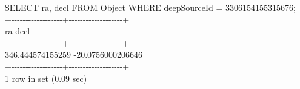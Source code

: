 \documentclass[DM,toc]{lsstdoc}
\begin{document}
SELECT ra, decl FROM Object WHERE deepSourceId = 3306154155315676;\\
+-\/-\/-\/-\/-\/-\/-\/-\/-\/-\/-\/-\/-\/-\/-\/-\/-\/-+-\/-\/-\/-\/-\/-\/-\/-\/-\/-\/-\/-\/-\/-\/-\/-\/-\/-\/-+\\
\textbar{} ra \textbar{} decl \textbar{}\\
+-\/-\/-\/-\/-\/-\/-\/-\/-\/-\/-\/-\/-\/-\/-\/-\/-\/-+-\/-\/-\/-\/-\/-\/-\/-\/-\/-\/-\/-\/-\/-\/-\/-\/-\/-\/-+\\
\textbar{} 346.444574155259 \textbar{} -20.0756000206646 \textbar{}\\
+-\/-\/-\/-\/-\/-\/-\/-\/-\/-\/-\/-\/-\/-\/-\/-\/-\/-+-\/-\/-\/-\/-\/-\/-\/-\/-\/-\/-\/-\/-\/-\/-\/-\/-\/-\/-+\\
1 row in set (0.09 sec)

~
\end{document}
